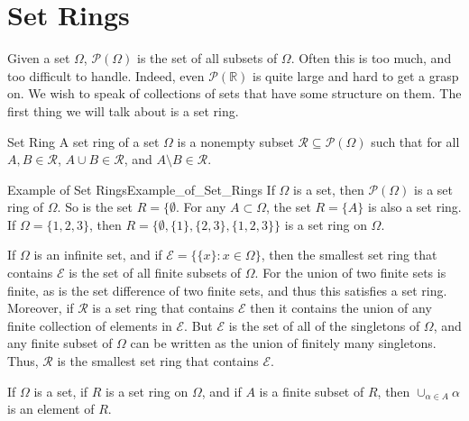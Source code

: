 \section{Set Rings}
    Given a set $\Omega$, $\mathcal{P}(\Omega)$ is the set of all subsets of
    $\Omega$. Often this is too much, and too difficult to handle. Indeed,
    even $\mathcal{P}(\mathbb{R})$ is quite large and hard to get a grasp on.
    We wish to speak of collections of sets that have some structure on them.
    The first thing we will talk about is a set ring.
    \begin{fdefinition}{Set Ring}
        A set ring of a set $\Omega$ is a nonempty subset
        $\mathcal{R}\subseteq\mathcal{P}(\Omega)$ such that
        for all $A,B\in\mathcal{R}$, $A\cup{B}\in\mathcal{R}$, and
        $A\setminus{B}\in\mathcal{R}$.
    \end{fdefinition}
    \begin{fexample}{Example of Set Rings}{Example_of_Set_Rings}
        If $\Omega$ is a set, then $\mathcal{P}(\Omega)$ is a set ring of
        $\Omega$. So is the set $R=\{\emptyset$. For any $A\subset\Omega$,
        the set $R=\{A\}$ is also a set ring. If $\Omega=\{1,2,3\}$, then
        $R=\{\emptyset,\{1\},\{2,3\},\{1,2,3\}\}$ is
        a set ring on $\Omega$.
    \end{fexample}
    \begin{lexample}
        If $\Omega$ is an infinite set, and if
        $\mathcal{E}=\big\{\{x\}:x\in\Omega\big\}$, then the smallest set
        ring that contains $\mathcal{E}$ is the set of all finite subsets of
        $\Omega$. For the union of two finite sets is finite, as is the set
        difference of two finite sets, and thus this satisfies a set ring.
        Moreover, if $\mathcal{R}$ is a set ring that contains $\mathcal{E}$
        then it contains the union of any finite collection of elements in
        $\mathcal{E}$. But $\mathcal{E}$ is the set of all of the singletons
        of $\Omega$, and any finite subset of $\Omega$ can be written as the
        union of finitely many singletons. Thus, $\mathcal{R}$ is the
        smallest set ring that contains $\mathcal{E}$.
    \end{lexample}
    \begin{theorem}
        If $\Omega$ is a set, if $R$ is a set ring on $\Omega$, and if $A$ is
        a finite subset of $R$, then $\cup_{\alpha\in{A}}\alpha$ is an
        element of $R$.
    \end{theorem}
